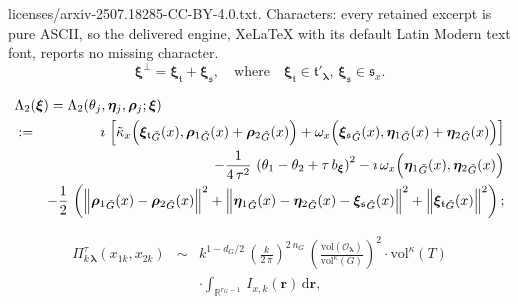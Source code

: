 \documentclass[10pt,a4paper]{amsart}
\begin{document}
licenses/arxiv-2507.18285-CC-BY-4.0.txt. Characters: every retained excerpt is pure ASCII, so the delivered engine, XeLaTeX with its default Latin Modern text font, reports no missing character.
\begin{equation}
\label{eqn:xitsperp}
\boldsymbol{\xi}^\perp=\boldsymbol{\xi}_{\mathfrak{t}}+\boldsymbol{\xi}_{\mathfrak{s}},
\quad\text{where}\quad\boldsymbol{\xi}_{\mathfrak{t}}\in 
\mathfrak{t}'_{\boldsymbol{\lambda}},\,
\boldsymbol{\xi}_{\mathfrak{s}}\in 
\mathfrak{s}_x.
\end{equation}

\begin{eqnarray}
\label{eqn:Lambdaxi defn}
\lefteqn{\Lambda_2(\boldsymbol{\xi})=
\Lambda_2(\theta_j,\boldsymbol{\eta}_j,\boldsymbol{\rho}_j;
\boldsymbol{\xi})}\\
&:=&
\imath\,
\left[ \tilde{\kappa}_x \Big(
{\boldsymbol{\xi}_{\mathfrak{t}}}_{\tilde{G}}(x)
,
{\boldsymbol{\rho}_1}_{\tilde{G}}(x)
+{\boldsymbol{\rho}_2}_{\tilde{G}}(x)\Big)
+\omega_x \Big(
{\boldsymbol{\xi}_{\mathfrak{s}}}_{\tilde{G}}(x),
{\boldsymbol{\eta}_1}_{\tilde{G}}(x)
+{\boldsymbol{\eta}_2}_{\tilde{G}}(x)
\Big)  \right]\nonumber\\
&&
-\frac{1}{4\,\tau^2}\,\left( \theta_1-\theta_2+\tau\,b_{\boldsymbol{\xi}}   \right)^2
-\imath\,
\omega_x\Big(
{\boldsymbol{\eta}_1}_{\tilde{G}}(x)
%
,
{\boldsymbol{\eta}_2}_{\tilde{G}}(x)  
\Big)
\nonumber\\
&&-\frac{1}{2}\,\left( \Big\|
{\boldsymbol{\rho}_1}_{\tilde{G}}(x)-{\boldsymbol{\rho}_2}_{\tilde{G}}(x)\Big\|^2
+\Big\|{\boldsymbol{\eta}_1}_{\tilde{G}}(x)
-{\boldsymbol{\eta}_2}_{\tilde{G}}(x)-{\boldsymbol{\xi}_{\mathfrak{s}}}_{\tilde{G}}(x)\Big\|^2
%
+\Big\|{\boldsymbol{\xi}_{\mathfrak{t}}}_{\tilde{G}}(x)
%
% 
\Big\|^2       \right);
\nonumber
\end{eqnarray}

\begin{eqnarray}
\label{eqn:Piklambda g expanded resc resc-12345}
\Pi^\tau_{k\,\boldsymbol{\lambda}}(x_{1k},x_{2k})
&\sim&
%
k^{1-d_G/2}\,
\left(\frac{k}{2\,\pi}\right)^{2\,n_G}\,
\left(\frac{\mathrm{vol}(\mathcal{O}_{\boldsymbol{\lambda}})}{\mathrm{vol}^\kappa (G)}\right)^2\cdot 
\mathrm{vol}^\kappa
(T)
\nonumber\\
&&\cdot \int_{\mathbb{R}^{r_G-1}}\,
I_{x,k}(\mathbf{r})\,\mathrm{d}\mathbf{r}
,
\end{eqnarray}
\end{document}
